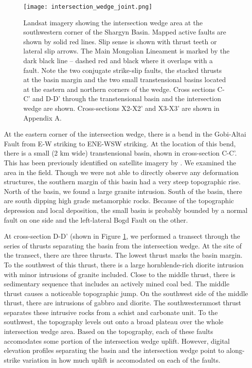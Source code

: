 \begin{figure}[h!]
  \centering
  \texttt{[image: intersection\_wedge\_joint.png]}
  \caption{Landsat imagery showing the intersection wedge area at the southwestern corner of the Shargyn Basin. Mapped active faults are shown by solid red lines. Slip sense is shown with thrust teeth or lateral slip arrows. The Main Mongolian Lineament is marked by the dark black line -- dashed red and black where it overlaps with a fault. Note the two conjugate strike-slip faults, the stacked thrusts at the basin margin and the two small transtensional basins located at the eastern and northern corners of the wedge. Cross sections C-C' and D-D' through the transtensional basin and the intersection wedge are shown. Cross-sections X2-X2' and X3-X3' are shown in Appendix A.}
  \label{intersection_wedge_joint}
\end{figure}

At the eastern corner of the intersection wedge, there is a bend in the Gobi-Altai Fault from E-W striking to ENE-WSW striking. At the location of this bend, there is a small (2 km wide) transtensional basin, shown in cross-section C-C'. This has been previously identified on satellite imagery by \citet{Cunningham2010}. We examined the area in the field. Though we were not able to directly observe any deformation structures, the southern margin of this basin had a very steep topographic rise. North of the basin, we found a large granite intrusion. South of the basin, there are south dipping high grade metamorphic rocks. Because of the topographic depression and local deposition, the small basin is probably bounded by a normal fault on one side and the left-lateral Bogd Fault on the other. 

At cross-section D-D' (shown in Figure \ref{intersection_wedge_joint}, we performed a transect through the series of thrusts separating the basin from the intersection wedge. At the site of the transect, there are three thrusts. The lowest thrust marks the basin margin. To the southwest of this thrust, there is a large hornblende-rich diorite intrusion with minor intrusions of granite included. Close to the middle thrust, there is sedimentary sequence that includes an actively mined coal bed. The middle thrust causes a noticeable topographic jump. On the southwest side of the middle thrust, there are intrusions of gabbro and diorite. The southwesternmost thrust separates these intrusive rocks from a schist and carbonate unit. To the southwest, the topography levels out onto a broad plateau over the whole intersection wedge area. Based on the topography, each of these faults accomodates some portion of the intersection wedge uplift. However, digital elevation profiles separating the basin and the intersection wedge point to along-strike variation in how much uplift is accomodated on each of the faults. 

